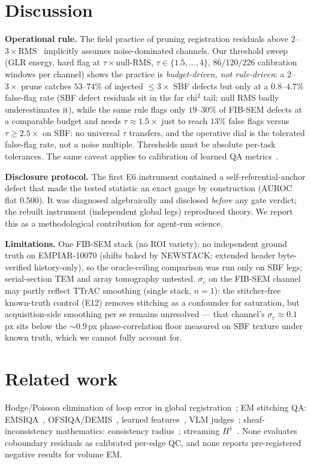 \documentclass[10pt]{article}
\begin{document}
\section{Discussion}
\textbf{Operational rule.} The field practice of pruning registration residuals above $2$--$3\times$RMS~\cite{wang14} implicitly assumes noise-dominated channels. Our threshold sweep (GLR energy, hard flag at $\tau\times$null-RMS, $\tau\in\{1.5,\dots,4\}$, 86/120/226 calibration windows per channel) shows the practice is \emph{budget-driven, not rule-driven}: a $2$--$3\times$ prune catches $53$--$74\%$ of injected $\leq\!3\times$ SBF defects but only at a $0.8$--$4.7\%$ false-flag rate (SBF defect residuals sit in the far chi$^2$ tail; null RMS badly underestimates it), while the same rule flags only $19$--$30\%$ of FIB-SEM defects at a comparable budget and needs $\tau{\approx}1.5\times$ just to reach $13\%$ false flags versus $\tau{\geq}2.5\times$ on SBF: no universal $\tau$ transfers, and the operative dial is the tolerated false-flag rate, not a noise multiple. Thresholds must be absolute per-task tolerances. The same caveat applies to calibration of learned QA metrics~\cite{emsiqa,savior}.

\textbf{Disclosure protocol.} The first E6 instrument contained a self-referential-anchor defect that made the tested statistic an exact gauge by construction (AUROC flat $0.500$). It was diagnosed algebraically and disclosed \emph{before} any gate verdict; the rebuilt instrument (independent global legs) reproduced theory. We report this as a methodological contribution for agent-run science.

\textbf{Limitations.} One FIB-SEM stack (no ROI variety); no independent ground truth on EMPIAR-10070 (shifts baked by NEWSTACK; extended header byte-verified history-only), so the oracle-ceiling comparison was run only on SBF legs; serial-section TEM and array tomography untested. $\sigma_c$ on the FIB-SEM channel may partly reflect TTrAC smoothing (single stack, $n{=}1$): the stitcher-free known-truth control (E12) removes stitching as a confounder for saturation, but acquisition-side smoothing per se remains unresolved --- that channel's $\sigma_c{\approx}0.1$\,px sits below the ${\sim}0.9$\,px phase-correlation floor measured on SBF texture under known truth, which we cannot fully account for.

\section{Related work}
Hodge/Poisson elimination of loop error in global registration~\cite{carlino22}; EM stitching QA: EMSIQA~\cite{emsiqa}, OFSIQA/DEMIS~\cite{demis}, learned features~\cite{jsee26}, VLM judges~\cite{savior}; sheaf-inconsistency mathematics: consistency radius~\cite{robinson22}; streaming $H^1$~\cite{h1inc}. None evaluates coboundary residuals as calibrated per-edge QC, and none reports pre-registered negative results for volume EM.
\end{document}
